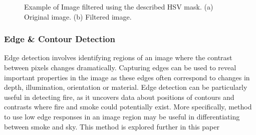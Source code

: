 \documentclass[lettersize,journal]{IEEEtran}
\begin{document}

\begin{figure}[!t]
\centering
{}
\hfil
{}
        \caption{Example of Image filtered using the described HSV mask. (a) Original image. (b) Filtered image.}
\label{hsvimg}
\end{figure}


\subsubsection{Edge \& Contour Detection}

Edge detection involves identifying regions of an image where the
contrast between pixels changes dramatically. Capturing edges can be
used to reveal important properties in the image as these edges often
correspond to changes in depth, illumination, orientation or material.
Edge detection can be particularly useful in detecting fire, as it
uncovers data about positions of contours and contrasts where fire and
smoke could potentially exist. More specifically, method to use low edge
responses in an image region may be useful in differentiating between
smoke and sky. This method is explored further in this paper
\end{document}
